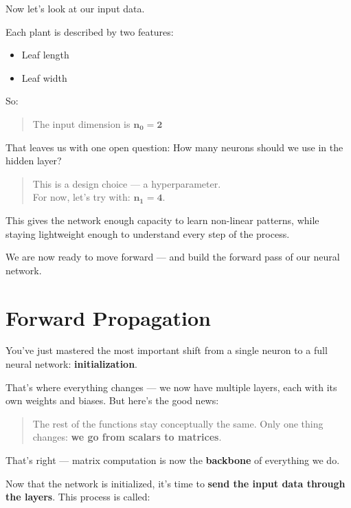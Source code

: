 \documentclass[11pt]{article}
\begin{document}
\medskip

Now let’s look at our input data.

Each plant is described by two features:
\begin{itemize}
    \item Leaf length
    \item Leaf width
\end{itemize}

So:

\begin{quote}
The input dimension is $\boldsymbol{n_0 = 2}$
\end{quote}

\medskip

That leaves us with one open question:  
How many neurons should we use in the hidden layer?

\begin{quote}
This is a design choice — a hyperparameter.\\
For now, let’s try with: $\boldsymbol{n_1 = 4}$.
\end{quote}

This gives the network enough capacity to learn non-linear patterns, while staying lightweight enough to understand every step of the process.

We are now ready to move forward — and build the forward pass of our neural network.

\section*{Forward Propagation}

You've just mastered the most important shift from a single neuron to a full neural network: \textbf{initialization}.

That’s where everything changes — we now have multiple layers, each with its own weights and biases.  
But here’s the good news:

\begin{quote}
The rest of the functions stay conceptually the same.  
Only one thing changes: \textbf{we go from scalars to matrices}.
\end{quote}

That’s right — matrix computation is now the \textbf{backbone} of everything we do.

\vspace{1em}

Now that the network is initialized, it’s time to \textbf{send the input data through the layers}.  
This process is called:
\end{document}
